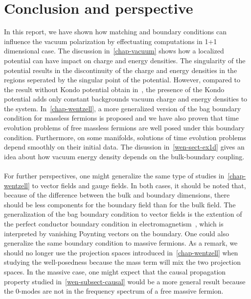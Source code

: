 \chapter{Conclusion and perspective}
In this report, we have shown how matching and boundary conditions can influence the vacuum polarization by effectuating computations in 1+1 dimensional case. 
The discussion in~\cref{chap-vacuum} shows how a localized  potential can have impact on charge and energy densities.
The singularity of the potential results in the discontinuity of the charge and energy densities in the regions seperated by the singular point of the potential.
However, compared to the result without Kondo potential obtain in~\cite{Zahn2015}, the presence of the Kondo potential adds only constant backgrounds vacuum charge and energy densities to the system. 
In~\cref{chap-wentzell}, a more generalized version of the bag boundary condition for massless fermions is proposed and we have also proven that time evolution problems of free massless fermions are well posed under this boundary condition.
Furthermore, on some manifolds, solutions of time evolution problems depend smoothly on their initial data.
The disussion in~\cref{wen-sect-ex1d} gives an idea about how vacuum energy density depends on the bulk-boundary coupling.
\\\\
For further perspectives, 
one might generalize the same type of studies in~\cref{chap-wentzell} to vector fields and gauge fields.
In both cases, it should be noted that, because of the difference between the bulk and boundary dimensions, 
there should be less components for the boundary field than for the bulk field.
The generalization of the bag boundary condition to vector fields is the extention of the perfect conductor boundary condition in electromagnetism~\cite{Stokes2015}, 
which is interpreted by vanishing Poynting vectors on the boundary.
One could also generalize the same boundary condition to massive fermions. 
As a remark, 
we should no longer use the projection spaces introduced in~\cref{chap-wentzell} when studying the well-posedness because the mass term will mix the two projection spaces.
In the massive case, one might expect that the causal propagation property studied in~\cref{wen-subsect-causal} would be a more general result because the 0-modes are not in the frequency spectrum of a free massive fermion. 




